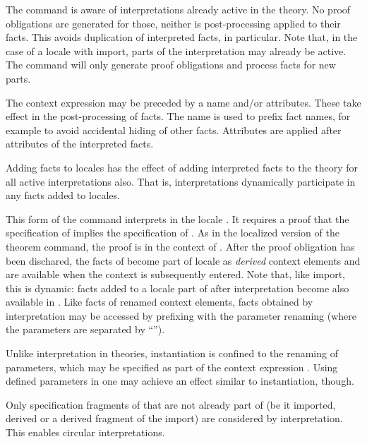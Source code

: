 \begin{isabellebody}
\begin{isamarkuptext}
\begin{descr}
  The command is aware of interpretations already active in the
  theory.  No proof obligations are generated for those, neither is
  post-processing applied to their facts.  This avoids duplication of
  interpreted facts, in particular.  Note that, in the case of a
  locale with import, parts of the interpretation may already be
  active.  The command will only generate proof obligations and
  process facts for new parts.

  The context expression may be preceded by a name and/or attributes.
  These take effect in the post-processing of facts.  The name is used
  to prefix fact names, for example to avoid accidental hiding of
  other facts.  Attributes are applied after attributes of the
  interpreted facts.

  Adding facts to locales has the effect of adding interpreted facts
  to the theory for all active interpretations also.  That is,
  interpretations dynamically participate in any facts added to
  locales.

  \item [\mbox{\isa{\isacommand{interpretation}}}~\isa{{\isachardoublequote}name\ {\isasymsubseteq}\ expr{\isachardoublequote}}]

  This form of the command interprets  in the locale
  .  It requires a proof that the specification of  implies the specification of .  As in the
  localized version of the theorem command, the proof is in the
  context of .  After the proof obligation has been
  dischared, the facts of  become part of locale  as \emph{derived} context elements and are available when the
  context  is subsequently entered.  Note that, like
  import, this is dynamic: facts added to a locale part of  after interpretation become also available in .
  Like facts of renamed context elements, facts obtained by
  interpretation may be accessed by prefixing with the parameter
  renaming (where the parameters are separated by ``\isa{{\isacharunderscore}}'').

  Unlike interpretation in theories, instantiation is confined to the
  renaming of parameters, which may be specified as part of the
  context expression .  Using defined parameters in  one may achieve an effect similar to instantiation, though.

  Only specification fragments of  that are not already
  part of  (be it imported, derived or a derived fragment
  of the import) are considered by interpretation.  This enables
  circular interpretations.


\end{descr}
\end{isamarkuptext}
\end{isabellebody}
